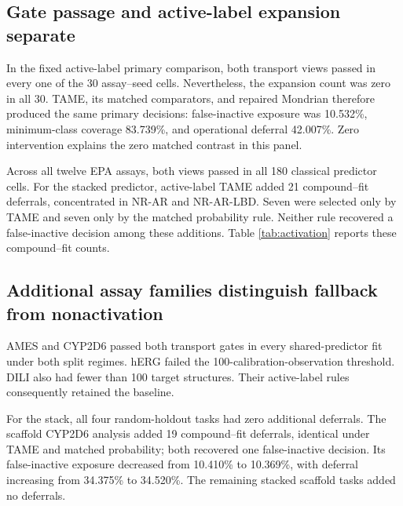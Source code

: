 \subsection{Gate passage and active-label expansion separate}
In the fixed active-label primary comparison, both transport views passed in every one of the 30 assay--seed cells. Nevertheless, the expansion count was zero in all 30. TAME, its matched comparators, and repaired Mondrian therefore produced the same primary decisions: false-inactive exposure was 10.532\%, minimum-class coverage 83.739\%, and operational deferral 42.007\%. Zero intervention explains the zero matched contrast in this panel.

Across all twelve EPA assays, both views passed in all 180 classical predictor cells. For the stacked predictor, active-label TAME added 21 compound--fit deferrals, concentrated in NR-AR and NR-AR-LBD. Seven were selected only by TAME and seven only by the matched probability rule. Neither rule recovered a false-inactive decision among these additions. Table \ref{tab:activation} reports these compound--fit counts.

\begin{table}[htbp]\centering\small
\caption{Active-label mechanism counts at $\alpha=0.10$ with the stack. Pass requires both views. Added counts are equal for TAME (A) and matched probability (P); A-only/P-only denotes discordant selections. Rescued lists erroneous inactive decisions recovered by A/P. Counts sum over fit seeds; the two EPA rows overlap.}\label{tab:activation}

\end{table}

\subsection{Additional assay families distinguish fallback from nonactivation}
AMES and CYP2D6 passed both transport gates in every shared-predictor fit under both split regimes. hERG failed the 100-calibration-observation threshold. DILI also had fewer than 100 target structures. Their active-label rules consequently retained the baseline.

For the stack, all four random-holdout tasks had zero additional deferrals. The scaffold CYP2D6 analysis added 19 compound--fit deferrals, identical under TAME and matched probability; both recovered one false-inactive decision. Its false-inactive exposure decreased from 10.410\% to 10.369\%, with deferral increasing from 34.375\% to 34.520\%. The remaining stacked scaffold tasks added no deferrals.

